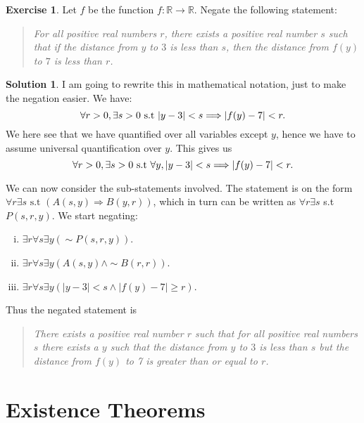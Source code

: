 \documentclass[a4paper, 11pt]{report}
\theoremstyle{plain}
\theoremstyle{definition}
\newtheorem{exrc}[thm]{Exercise}
\newtheorem*{sltn}{Solution}
\newcommand{\impl}{\Longrightarrow}
\renewcommand{\neg}{{\sim}} %
\begin{document}
  \begin{exrc}
    Let $f$ be the function $ f : \mathbb{R} \rightarrow \mathbb{R}$. Negate
    the following statement:
    \begin{quote}
      \textit{For all positive real numbers $r$, there exists a positive real
      number $s$ such that if the distance from $y$ to $3$ is less than $s$,
    then the distance from $f(y)$ to $7$ is less than $r$.}
    \end{quote}
  \end{exrc}
  \begin{sltn}
  I am going to rewrite this in mathematical notation, just to make the negation easier.
  We have:
  \begin{equation}
    \notag
    \forall r > 0, \exists s > 0 \text{ s.t } |y - 3| < s \impl |f(y) - 7| < r.
  \end{equation}
  We here see that we have quantified over all variables except $y$, hence we
  have to assume universal quantification over $y$. This gives us
  \begin{equation}
    \notag
    \forall r > 0, \exists s > 0 \text{ s.t }\forall y,  |y - 3| < s \impl |f(y) - 7| < r.
  \end{equation}

  We can now consider the sub-statements involved. 
  The statement is on the form $\forall r \exists s \text{ s.t } (A(s, y) \impl B(y, r))$,
  which in turn can be written as $\forall r \exists s$ s.t $P(s, r, y)$.
  We start negating:
  \begin{enumerate}[i.]
    \item $\exists r \forall s \exists y (\neg P(s, r, y))$.
    \item $\exists r \forall s \exists y (A(s, y) \land \neg B(r, r))$.
    \item $\exists r \forall s \exists y (|y - 3| < s \land |f(y) - 7| \geq r)$.
  \end{enumerate}
  Thus the negated statement is
  \begin{quote}
    \textit{There exists a positive real number $r$ such that for all positive
    real numbers $s$ there exists a $y$ such that the distance from $y$ to $3$
  is less than $s$ but the distance from $f(y)$ to 7 is greater than or equal
to $r$.}
  \end{quote}
  \end{sltn}

\section{Existence Theorems}
\label{sec:existence_theorems}
\end{document}
